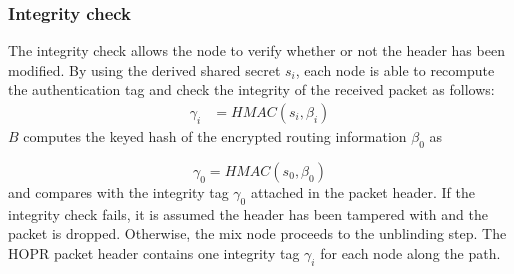 \subsubsection{Integrity check}
\label{sec:sphinx:integrity}

The integrity check allows the node to verify whether or not the header has been modified. By using the derived shared secret $s_i$, each node is able to recompute the authentication tag and check the integrity of the received packet as follows:
\begin{align}
    \gamma_i & =HMAC(s_i,\beta_i)
    \label{eq:6}
\end{align}
$B$ computes the keyed hash of the encrypted routing information $\beta_0$ as

$$\gamma_0=HMAC(s_0,\beta_0)$$
and compares with the integrity tag $\gamma_0$ attached in the packet header. If the integrity check fails, it is assumed the header has been tampered with and the packet is dropped. Otherwise, the mix node proceeds to the unblinding step. The HOPR packet header contains one integrity tag $\gamma_i$ for each node along the path.